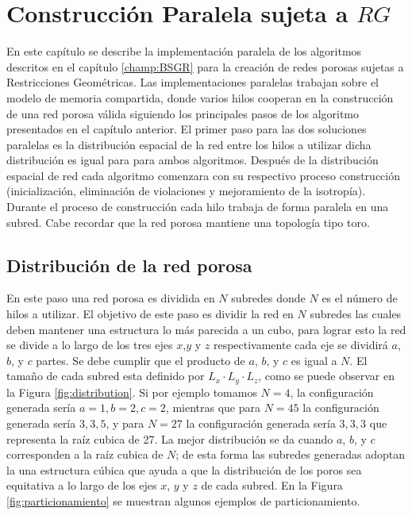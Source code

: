 \chapter{Construcción Paralela sujeta a $RG$}
\label{champ:PBSGR}
\bigskip
\barra
\bigskip
En este capítulo se describe la implementación paralela de los algoritmos descritos en el capítulo \ref{champ:BSGR} para la creación de redes porosas sujetas a Restricciones Geométricas. Las implementaciones paralelas trabajan sobre el modelo  de memoria compartida, donde varios hilos cooperan en la construcción de una red porosa válida siguiendo los principales pasos de los algoritmo presentados en el capítulo anterior. El primer paso para las dos soluciones paralelas es la distribución espacial de la red entre los hilos a utilizar dicha distribución es igual para para ambos algoritmos. Después de la distribución espacial de red cada algoritmo comenzara con su respectivo proceso construcci\'on (inicializaci\'on, eliminaci\'on de violaciones y mejoramiento de la isotrop\'ia). Durante el proceso de construcción cada hilo trabaja de forma paralela en una subred. Cabe recordar que la red porosa mantiene una topolog\'ia tipo toro.

\section{Distribución de la red porosa}
\label{sec:pdistribution}
En este paso una red porosa es dividida en $N$ subredes donde $N$ es el número de hilos a utilizar. El objetivo de este paso es dividir la red en $N$ subredes las cuales deben mantener una estructura lo más parecida a un cubo, para lograr esto la red se divide a lo largo de los tres ejes $x$,$y$ y $z$ respectivamente cada eje se dividirá $a$, $b$, y $c$ partes. Se debe cumplir que el producto de  $a$, $b$, y $c$ es igual a $N$. El tamaño de cada subred esta definido por $L_x \cdot L_y \cdot L_z$, como se puede observar en la Figura \ref{fig:distribution}. Si por ejemplo tomamos $N=4$, la configuración generada ser\'ia $a=1,b=2,c=2$, mientras que para $N=45$ la configuración generada ser\'ia $3,3,5$, y para  $N = 27$ la configuración generada ser\'ia $3,3,3$ que representa la raíz cubica de 27. La mejor distribución se da cuando $a$, $b$, y $c$ corresponden a la raíz cubica de $N$; de esta forma las subredes generadas adoptan la una estructura cúbica que ayuda a que la distribución de los poros sea equitativa a lo largo de los ejes $x$, $y$ y $z$ de cada subred. En la Figura \ref{fig:particionamiento} se muestran algunos ejemplos de particionamiento.\\

